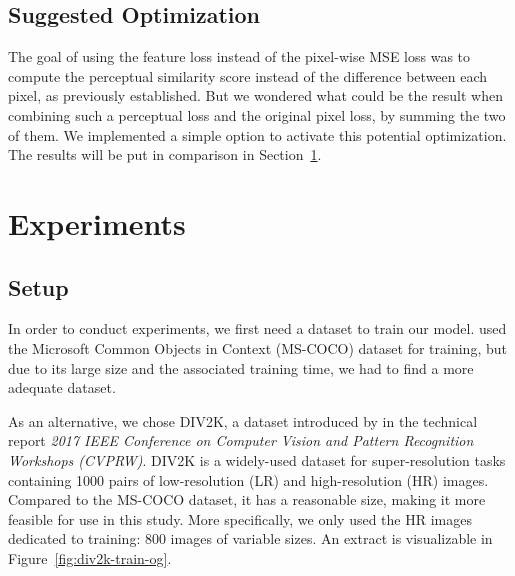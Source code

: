 \documentclass{article}
\begin{document}
{    \subsection{Suggested Optimization}
    \label{subsec:suggested-optimization}

    The goal of using the feature loss instead of the pixel-wise MSE loss was to compute the perceptual similarity score instead of the difference between each pixel, as previously established. But we wondered what could be the result when combining such a perceptual loss and the original pixel loss, by summing the two of them. We implemented a simple option to activate this potential optimization. The results will be put in comparison in Section~\ref{sec:experiments}.
}

{
    \section{Experiments}
    \label{sec:experiments}

    \subsection{Setup}
    \label{subsec:setup}

    In order to conduct experiments, we first need a dataset to train our model. \cite{sr} used the Microsoft Common Objects in Context (MS-COCO) dataset \citep{mscoco} for training, but due to its large size and the associated training time, we had to find a more adequate dataset.

    As an alternative, we chose DIV2K, a dataset introduced by \cite{div2k_ds} in the technical report \textit{2017 IEEE Conference on Computer Vision and Pattern Recognition Workshops (CVPRW)}. DIV2K is a widely-used dataset for super-resolution tasks containing 1000 pairs of low-resolution (LR) and high-resolution (HR) images. Compared to the MS-COCO dataset, it has a reasonable size, making it more feasible for use in this study. More specifically, we only used the HR images dedicated to training: 800 images of variable sizes. An extract is visualizable in Figure~\ref{fig:div2k-train-og}.

}
\end{document}
